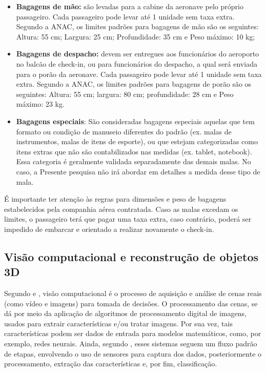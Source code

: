     \begin{itemize}
        \item \textbf{Bagagens de mão:} são levadas para a cabine da aeronave pelo próprio passageiro. Cada passageiro pode levar até 1 unidade sem taxa extra. Segundo a ANAC, os limites padrões para bagagens de mão são os seguintes: Altura: 55 cm; Largura: 25 cm; Profundidade: 35 cm e Peso máximo: 10 kg;
        \item \textbf{Bagagens de despacho:} devem ser entregues aos funcionários do aeroporto no balcão de check-in, ou para funcionários do despacho, a qual será enviada para o porão da aeronave. Cada passageiro pode levar até 1 unidade sem taxa extra. Segundo a ANAC, os limites padrões para bagagens de porão são os seguintes: Altura: 55 cm; largura: 80 cm; profundidade: 28 cm e Peso máximo: 23 kg.
        \item \textbf{Bagagens especiais}: São consideradas bagagens especiais aquelas que tem formato ou condição de manuseio diferentes do padrão (ex. malas de instrumentos, malas de itens de esporte), ou que estejam categorizadas como itens extras que não são contabilizados nas medidas (ex. tablet, notebook). Essa categoria é geralmente validada separadamente das demais malas. No caso, a Presente pesquisa não irá abordar em detalhes a medida desse tipo de mala.
    \end{itemize}
    
    É importante ter atenção às regras para dimensões e peso de bagagens estabelecidos pela companhia aérea contratada. Caso as malas excedam os limites, o passageiro terá que pagar uma taxa extra, caso contrário, poderá ser impedido de embarcar e orientado a realizar novamente o check-in. 


\subsection{Visão computacional e reconstrução de objetos 3D}
\label{subsec_Visão computacional e reconstrução de objetos 3D}

    Segundo  e , visão computacional é o processo de aquisição e análise de cenas reais (como vídeo e imagens) para tomada de decisões. O processamento das cenas, se dá por meio da aplicação de algoritmos de processamento digital de imagens, usados para extrair características e/ou tratar imagens. Por sua vez, tais características podem ser dados de entrada para modelos matemáticos, como, por exemplo, redes neurais. Ainda, segundo , esses sistemas seguem um fluxo padrão de etapas, envolvendo o uso de sensores para captura dos dados, posteriormente o processamento, extração das características e, por fim, classificação.

